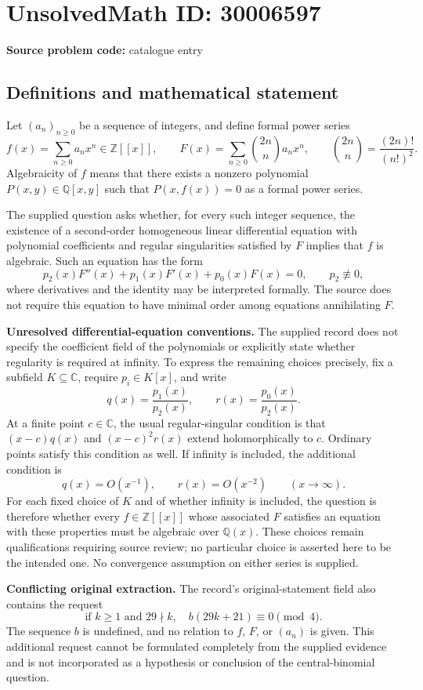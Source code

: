 \documentclass[11pt]{article}
\newcommand{\Z}{\mathbb{Z}}
\newcommand{\Q}{\mathbb{Q}}
\newcommand{\C}{\mathbb{C}}
\begin{document}
\section*{UnsolvedMath ID: 30006597}
\textbf{Source problem code:} catalogue entry
\subsection{Definitions and mathematical statement}
Let \((a_n)_{n\geq 0}\) be a sequence of integers, and define formal power series
\[
f(x)=\sum_{n\geq 0}a_nx^n\in\Z[[x]],\qquad F(x)=\sum_{n\geq 0}\binom{2n}{n}a_nx^n,
\qquad \binom{2n}{n}=\frac{(2n)!}{(n!)^2}.
\]
Algebraicity of \(f\) means that there exists a nonzero polynomial \(P(x,y)\in\Q[x,y]\) such that \(P(x,f(x))=0\) as a formal power series.

The supplied question asks whether, for every such integer sequence, the existence of a second-order homogeneous linear differential equation with polynomial coefficients and regular singularities satisfied by \(F\) implies that \(f\) is algebraic. Such an equation has the form
\[
p_2(x)F''(x)+p_1(x)F'(x)+p_0(x)F(x)=0,
\qquad p_2\not\equiv 0,
\]
where derivatives and the identity may be interpreted formally. The source does not require this equation to have minimal order among equations annihilating \(F\).

\textbf{Unresolved differential-equation conventions.} The supplied record does not specify the coefficient field of the polynomials or explicitly state whether regularity is required at infinity. To express the remaining choices precisely, fix a subfield \(K\subseteq\C\), require \(p_i\in K[x]\), and write
\[
q(x)=\frac{p_1(x)}{p_2(x)},\qquad r(x)=\frac{p_0(x)}{p_2(x)}.
\]
At a finite point \(c\in\C\), the usual regular-singular condition is that \((x-c)q(x)\) and \((x-c)^2r(x)\) extend holomorphically to \(c\). Ordinary points satisfy this condition as well. If infinity is included, the additional condition is
\[
q(x)=O(x^{-1}),\qquad r(x)=O(x^{-2})\qquad (x\to\infty).
\]
For each fixed choice of \(K\) and of whether infinity is included, the question is therefore whether every \(f\in\Z[[x]]\) whose associated \(F\) satisfies an equation with these properties must be algebraic over \(\Q(x)\). These choices remain qualifications requiring source review; no particular choice is asserted here to be the intended one. No convergence assumption on either series is supplied.

\textbf{Conflicting original extraction.} The record's original-statement field also contains the request
\[
\text{if }k\geq 1\text{ and }29\nmid k,\quad b(29k+21)\equiv 0\pmod 4.
\]
The sequence \(b\) is undefined, and no relation to \(f\), \(F\), or \((a_n)\) is given. This additional request cannot be formulated completely from the supplied evidence and is not incorporated as a hypothesis or conclusion of the central-binomial question.
\end{document}
